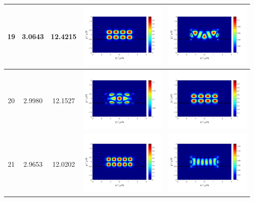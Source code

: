 \documentclass{assignment}
\begin{document}
\begin{sol}
\begin{itemize}
\begin{longtable}[c]{|c|c|c|c|c|}
            19 & 3.0643 & 12.4215 & \includegraphics[width=.3\columnwidth]{Assignment-2-mode-19-Ex.png} & \includegraphics[width=.3\columnwidth]{Assignment-2-mode-19-Ey.png} \\ \hline
            20 & 2.9980 & 12.1527 & \includegraphics[width=.3\columnwidth]{Assignment-2-mode-20-Ex.png} & \includegraphics[width=.3\columnwidth]{Assignment-2-mode-20-Ey.png} \\ \hline
            21 & 2.9653 & 12.0202 & \includegraphics[width=.3\columnwidth]{Assignment-2-mode-21-Ex.png} & \includegraphics[width=.3\columnwidth]{Assignment-2-mode-21-Ey.png} \\ \hline

\end{longtable}
\end{itemize}
\end{sol}
\end{document}
